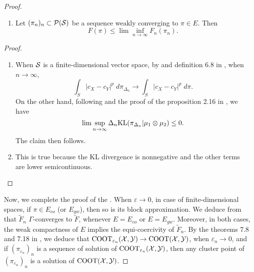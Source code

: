 \begin{proof}
\begin{lemma}
\begin{enumerate}
        \item Let $(\pi_n)_n \subset \mathcal P(\mathcal S)$ be a sequence weakly converging to $\pi \in E$. Then
        \begin{equation}
          F(\pi) \leq \lim \inf_{n \to \infty} F_{n}(\pi_n).
        \end{equation}
      \end{enumerate}
    \end{lemma}
    \begin{proof}
      \text{ }
      \begin{enumerate}
        \item When $\mathcal S$ is a finite-dimensional vector space, by  and
        definition 6.8 in \citep{Villani08}, when $n \to \infty$,
        \begin{equation}
          \int_S \vert c_X - c_Y\vert^p \; d\pi_{\Delta_n} \to \int_S \vert c_X - c_Y\vert^p \; d\pi.
        \end{equation}
        On the other hand, following  and the proof of the proposition 2.16 in \citep{Carlier17}, we have
        \begin{equation}
          \lim\sup_{n \to \infty} \Delta_n \text{KL}(\pi_{\Delta_n} \vert \mu_1 \otimes \mu_2) \leq 0.
        \end{equation}
        The claim then follows.

        \item This is true because the KL divergence is nonnegative and the other terms are lower semicontinuous.
      \end{enumerate}
    \end{proof}
    Now, we complete the proof of the .
    When $\varepsilon \to 0$, in case of finite-dimensional spaces, if $\pi \in E_{co}$ (or $E_{gw}$), then so is its block approximation.
    We deduce from  that $\widetilde{F}_{n}$ $\Gamma$-converges to
    $\widetilde{F}$, whenever $E = E_{co}$ or $E = E_{gw}$. Moreover, in both cases, the weak compactness of $E$ implies the equi-coercivity
    of $\widetilde{F}_n$. By the theorems 7.8 and 7.18 in \citep{Maso93}, we deduce that
    $\text{COOT}_{\varepsilon_n}(\mathcal X, \mathcal Y) \to \text{COOT}(\mathcal X, \mathcal Y)$, when $\varepsilon_n \to 0$,
    and if $(\pi_{\varepsilon_n})_{n}$ is a sequence of solution of $\text{COOT}_{\varepsilon_n}(\mathcal X, \mathcal Y)$,
    then any cluster point of $(\pi_{\varepsilon_n})_{n}$ is a solution of $\text{COOT}(\mathcal X, \mathcal Y)$.
  \end{proof}

